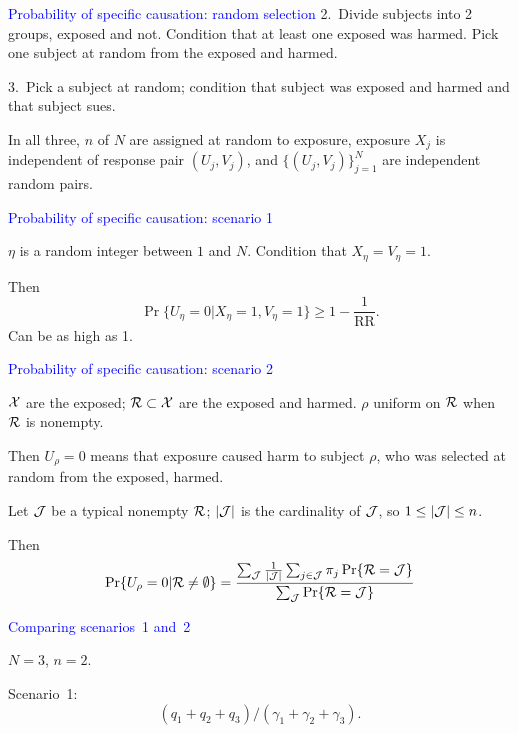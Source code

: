 \documentclass[landscape]{slides}
\newcommand{\RR}{{\mbox{RR}}}
\newcommand{\cJ}{{\cal J}}
\newcommand{\cR}{{\cal R}}
\newcommand{\cX}{{\cal X}}
\newcommand{\beq}{\begin{equation}}
\newcommand{\eeq}{\end{equation}}
\begin{document}
\begin{slide}
\begin{slide}{\textcolor{blue}{Probability of specific causation: random selection}}
2.~Divide subjects into 2 groups, exposed and not.
Condition that at least one exposed was harmed.
Pick one subject at random from the exposed and harmed.

3.~Pick a subject at random; condition that subject was exposed and harmed
and that subject sues.

In all three, $n$ of $N$ are assigned at random to exposure, exposure $X_j$
is independent of response pair $(U_j, V_j)$, and $\{(U_j, V_j)\}_{j=1}^N$ are independent
random pairs.

\end{slide}


\begin{slide}{\textcolor{blue}{Probability of specific causation: scenario 1}}

$\eta$ is a random integer between $1$ and $N$.
Condition that $X_\eta = V_\eta = 1$.

Then
\beq
   \Pr \{ U_\eta = 0 | X_\eta = 1, V_\eta = 1 \} \ge 1 - \frac{1}{\RR}.
\eeq
Can be as high as 1.

\end{slide}

\begin{slide}{\textcolor{blue}{Probability of specific causation: scenario 2}}

$\cX$ are the exposed; $\cR \subset \cX$ are the exposed and harmed.
$\rho$ uniform on $\cR$ when $\cR$ is nonempty.

Then $U_\rho = 0$ means that exposure caused harm to subject $\rho$, who was
selected at random from the exposed, harmed.

Let $\cJ$ be a typical nonempty $\cR$; $|\cJ|$ is the cardinality of $\cJ$, so
$1 \le |\cJ| \le n$.

Then
\beq
   \Pr \{ U_\rho = 0 | \cR \ne \emptyset \} =
   \frac{\sum_\cJ \frac{1}{|\cJ|} \sum_{j \in \cJ} \pi_j \Pr \{ \cR = \cJ\}}{\sum_\cJ \Pr \{ \cR = \cJ \}}
\eeq

\end{slide}

\begin{slide}{\textcolor{blue}{Comparing scenarios~1 and~2}}

$N = 3$, $n=2$.

Scenario~1:
\beq
   (q_1 + q_2 + q_3)/(\gamma_1 + \gamma_2 + \gamma_3).
\eeq


\end{slide}
\end{slide}
\end{document}
